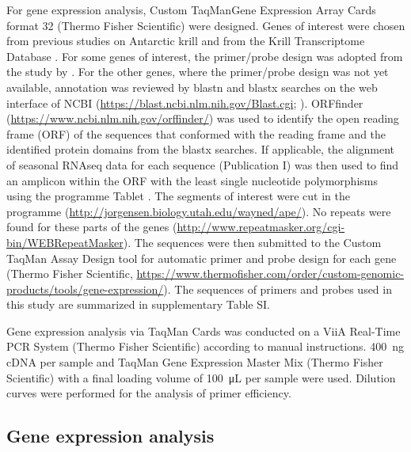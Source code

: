 For gene expression analysis, Custom TaqMan\texttrademark Gene Expression Array
Cards format 32 (Thermo Fisher Scientific) were designed. Genes of interest
were chosen from previous studies on Antarctic krill \citep[and Höring et al.,
in prep]{piccolin_seasonal_2018} and from the Krill Transcriptome Database
\citep{sales_krilldb:_2017}. For some genes of interest, the primer/probe
design was adopted from the study by \citet{piccolin_seasonal_2018}. For the
other genes, where the primer/probe design was not yet available, annotation
was reviewed by blastn and blastx searches on the web interface of NCBI
(\url{https://blast.ncbi.nlm.nih.gov/Blast.cgi}; \citet{johnson_ncbi_2008}).
ORFfinder (\url{https://www.ncbi.nlm.nih.gov/orffinder/}) was used to identify
the open reading frame (ORF) of the sequences that conformed with the reading
frame and the identified protein domains from the blastx searches. If
applicable, the alignment of seasonal RNAseq data for each sequence
(Publication I) was then used to find an amplicon within the ORF with the least
single nucleotide polymorphisms using the programme Tablet
\citep{milne_tabletnext_2010}. The segments of interest were cut in the
programme  (\url{http://jorgensen.biology.utah.edu/wayned/ape/}).
No repeats were found for these parts of the genes
(\url{http://www.repeatmasker.org/cgi-bin/WEBRepeatMasker}).  The sequences
were then submitted to the Custom TaqMan\textsuperscript{\textregistered} Assay
Design tool for automatic primer and probe design for each gene (Thermo Fisher
Scientific,
\url{https://www.thermofisher.com/order/custom-genomic-products/tools/gene-expression/}).
The sequences of primers and probes used in this study are summarized in
supplementary Table SI. 


Gene expression analysis via TaqMan\textsuperscript{\textregistered} Cards was
conducted on a ViiA Real-Time PCR System (Thermo Fisher
Scientific) according to manual instructions. \SI{400}{\nano\gram} cDNA per
sample and TaqMan\textsuperscript{\textregistered} Gene Expression Master Mix
(Thermo Fisher Scientific) with a final loading volume of
\SI{100}{\micro\liter} per sample were used.  Dilution curves were performed
for the analysis of primer efficiency. 

\subsection{Gene expression analysis}

